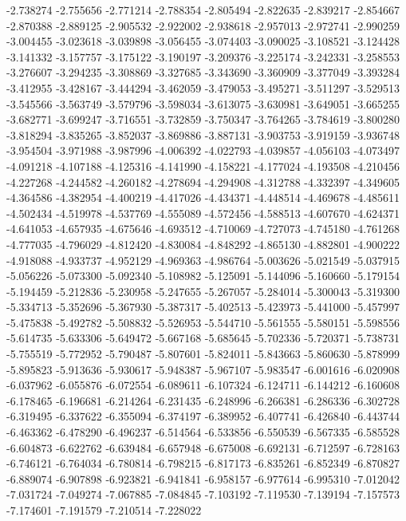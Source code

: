 -2.738274
-2.755656
-2.771214
-2.788354
-2.805494
-2.822635
-2.839217
-2.854667
-2.870388
-2.889125
-2.905532
-2.922002
-2.938618
-2.957013
-2.972741
-2.990259
-3.004455
-3.023618
-3.039898
-3.056455
-3.074403
-3.090025
-3.108521
-3.124428
-3.141332
-3.157757
-3.175122
-3.190197
-3.209376
-3.225174
-3.242331
-3.258553
-3.276607
-3.294235
-3.308869
-3.327685
-3.343690
-3.360909
-3.377049
-3.393284
-3.412955
-3.428167
-3.444294
-3.462059
-3.479053
-3.495271
-3.511297
-3.529513
-3.545566
-3.563749
-3.579796
-3.598034
-3.613075
-3.630981
-3.649051
-3.665255
-3.682771
-3.699247
-3.716551
-3.732859
-3.750347
-3.764265
-3.784619
-3.800280
-3.818294
-3.835265
-3.852037
-3.869886
-3.887131
-3.903753
-3.919159
-3.936748
-3.954504
-3.971988
-3.987996
-4.006392
-4.022793
-4.039857
-4.056103
-4.073497
-4.091218
-4.107188
-4.125316
-4.141990
-4.158221
-4.177024
-4.193508
-4.210456
-4.227268
-4.244582
-4.260182
-4.278694
-4.294908
-4.312788
-4.332397
-4.349605
-4.364586
-4.382954
-4.400219
-4.417026
-4.434371
-4.448514
-4.469678
-4.485611
-4.502434
-4.519978
-4.537769
-4.555089
-4.572456
-4.588513
-4.607670
-4.624371
-4.641053
-4.657935
-4.675646
-4.693512
-4.710069
-4.727073
-4.745180
-4.761268
-4.777035
-4.796029
-4.812420
-4.830084
-4.848292
-4.865130
-4.882801
-4.900222
-4.918088
-4.933737
-4.952129
-4.969363
-4.986764
-5.003626
-5.021549
-5.037915
-5.056226
-5.073300
-5.092340
-5.108982
-5.125091
-5.144096
-5.160660
-5.179154
-5.194459
-5.212836
-5.230958
-5.247655
-5.267057
-5.284014
-5.300043
-5.319300
-5.334713
-5.352696
-5.367930
-5.387317
-5.402513
-5.423973
-5.441000
-5.457997
-5.475838
-5.492782
-5.508832
-5.526953
-5.544710
-5.561555
-5.580151
-5.598556
-5.614735
-5.633306
-5.649472
-5.667168
-5.685645
-5.702336
-5.720371
-5.738731
-5.755519
-5.772952
-5.790487
-5.807601
-5.824011
-5.843663
-5.860630
-5.878999
-5.895823
-5.913636
-5.930617
-5.948387
-5.967107
-5.983547
-6.001616
-6.020908
-6.037962
-6.055876
-6.072554
-6.089611
-6.107324
-6.124711
-6.144212
-6.160608
-6.178465
-6.196681
-6.214264
-6.231435
-6.248996
-6.266381
-6.286336
-6.302728
-6.319495
-6.337622
-6.355094
-6.374197
-6.389952
-6.407741
-6.426840
-6.443744
-6.463362
-6.478290
-6.496237
-6.514564
-6.533856
-6.550539
-6.567335
-6.585528
-6.604873
-6.622762
-6.639484
-6.657948
-6.675008
-6.692131
-6.712597
-6.728163
-6.746121
-6.764034
-6.780814
-6.798215
-6.817173
-6.835261
-6.852349
-6.870827
-6.889074
-6.907898
-6.923821
-6.941841
-6.958157
-6.977614
-6.995310
-7.012042
-7.031724
-7.049274
-7.067885
-7.084845
-7.103192
-7.119530
-7.139194
-7.157573
-7.174601
-7.191579
-7.210514
-7.228022

